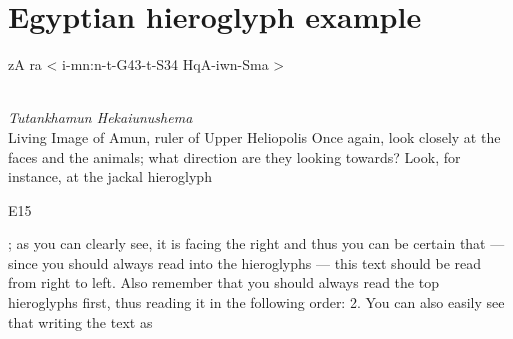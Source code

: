 \documentclass[a4paper]{article}
\begin{document}
  \section*{Egyptian hieroglyph example}

  \begin{hieroglyph}zA ra < i-mn:n-t-G43-t-S34 HqA-iwn-Sma >\end{hieroglyph} \\
  {\em Tutankhamun Hekaiunushema} \\
  Living Image of Amun, ruler of Upper Heliopolis
	Once again, look closely at the faces and the animals; what direction are they looking towards? Look, for instance, at the jackal hieroglyph \begin{hieroglyph}E15\end{hieroglyph}; as you can clearly see, it is facing the right and thus you can be certain that — since you should always read into the hieroglyphs — this text should be read from right to left. Also remember that you should always read the top hieroglyphs first, thus reading it in the following order: 2. You can also easily see that writing the text as
\end{document}
